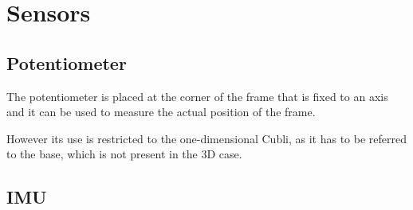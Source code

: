 \section{Sensors}

\subsection{Potentiometer}
The potentiometer is placed at the corner of the frame that is fixed to an axis and it can be used to measure the actual position of the frame.

However its use is restricted to the one-dimensional Cubli, as it has to be referred to the base, which is not present in the 3D case.


\subsection{IMU}
